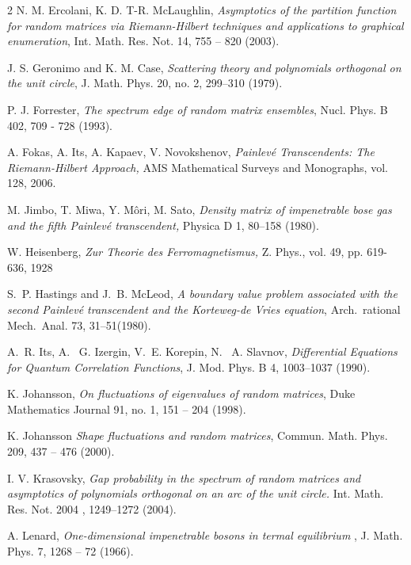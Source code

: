 \documentclass[11pt,letterpaper,reqno]{amsart}
\theoremstyle{definition}
\theoremstyle{remark}
\numberwithin{equation}{section}
\begin{document}
\begin{thebibliography}{2}
 N. M. Ercolani,  K. D. T-R. McLaughlin, {\it Asymptotics of the partition function for
random matrices via Riemann-Hilbert techniques and applications to graphical enumeration},
Int. Math. Res. Not. 14, 755 -- 820 (2003).

 J. S. Geronimo and K. M. Case, {\it Scattering theory and polynomials orthogonal on the unit
circle}, J. Math. Phys. 20, no. 2, 299--310 (1979).

 P. J. Forrester, {\it The spectrum edge of random matrix ensembles}, Nucl. Phys. B
402, 709 - 728 (1993).


 A. Fokas, A. Its, A. Kapaev, V. Novokshenov, {\it Painlev\'e Transcendents:
The Riemann-Hilbert Approach,} AMS  Mathematical Surveys and Monographs, vol. 128,
2006.

M. Jimbo, T. Miwa, Y. M\^ori, M. Sato, {\it Density matrix of impenetrable
bose gas and the fifth Painlev\'e transcendent,} Physica D 1, 80--158 (1980).

W. Heisenberg, {\it Zur Theorie des Ferromagnetismus,} Z. Phys., vol. 49, pp. 619-636, 1928

S.~P. Hastings and J.~B. McLeod, \textit{A boundary value problem associated
with the second Painlev\'e transcendent and the Korteweg-de Vries
equation},  Arch.\ rational Mech.\ Anal. 73, 31--51(1980).


 A.~R. Its, A.~ G. Izergin, V.~E. Korepin, N.~ A. Slavnov,
{\it Differential Equations for Quantum Correlation Functions},
J. Mod. Phys. B 4, 1003--1037  (1990).


 K. Johansson, {\it On fluctuations of eigenvalues of random matrices}, Duke
Mathematics Journal 91, no. 1, 151 -- 204  (1998).



 K.  Johansson {\it  Shape fluctuations and random matrices},  Commun. Math. Phys.
209, 437 -- 476  (2000).

 I. V. Krasovsky, {\it Gap probability in the spectrum of random matrices
and asymptotics of polynomials orthogonal on an arc of the unit
circle.}  Int. Math. Res. Not. 2004 , 1249--1272 (2004).



 A. Lenard, {\it One-dimensional impenetrable bosons in termal equilibrium }, J. Math. Phys.
7, 1268 -- 72 (1966).


\end{thebibliography}
\end{document}
